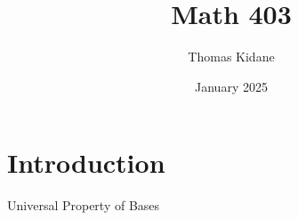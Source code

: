 \documentclass{article}
\title{Math 403}
\author{Thomas Kidane}
\date{January 2025}
\begin{document}
\maketitle

\section{Introduction}

Universal Property of Bases
\end{document}
